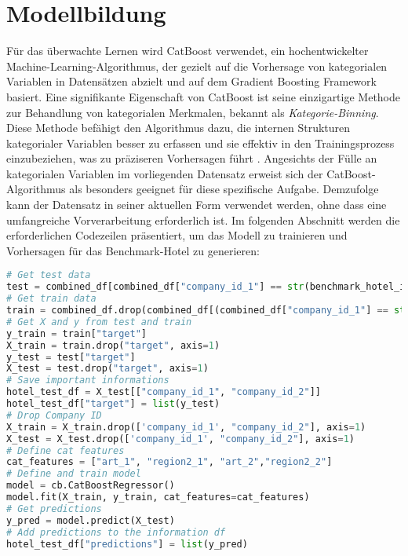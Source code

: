\section{Modellbildung}
\label{subsubsec:learn_model}
Für das überwachte Lernen wird CatBoost verwendet, ein hochentwickelter Machine-Learning-Algorithmus, der gezielt auf die Vorhersage von kategorialen Variablen in Datensätzen abzielt und auf dem Gradient Boosting Framework basiert. Eine signifikante Eigenschaft von CatBoost ist seine einzigartige Methode zur Behandlung von kategorialen Merkmalen, bekannt als \emph{Kategorie-Binning}. Diese Methode befähigt den Algorithmus dazu, die internen Strukturen kategorialer Variablen besser zu erfassen und sie effektiv in den Trainingsprozess einzubeziehen, was zu präziseren Vorhersagen führt \cite{Hancock.2020}.
\newline
\newline
Angesichts der Fülle an kategorialen Variablen im vorliegenden Datensatz erweist sich der CatBoost-Algorithmus als besonders geeignet für diese spezifische Aufgabe. Demzufolge kann der Datensatz in seiner aktuellen Form verwendet werden, ohne dass eine umfangreiche Vorverarbeitung erforderlich ist.
\newline
\newline
Im folgenden Abschnitt werden die erforderlichen Codezeilen präsentiert, um das Modell zu trainieren und Vorhersagen für das Benchmark-Hotel zu generieren:

\begin{lstlisting}[language=Python, label=lst:learn_model_train, caption=Erzeugung der Vorhersagen von ähnlichen Hotels mittels CatBoost]
# Get test data
test = combined_df[combined_df["company_id_1"] == str(benchmark_hotel_id)]
# Get train data
train = combined_df.drop(combined_df[(combined_df["company_id_1"] == str(benchmark_hotel_id)) | (combined_df["company_id_2"] == str(benchmark_hotel_id))].index)
# Get X and y from test and train
y_train = train["target"]
X_train = train.drop("target", axis=1)
y_test = test["target"]
X_test = test.drop("target", axis=1)
# Save important informations
hotel_test_df = X_test[["company_id_1", "company_id_2"]]
hotel_test_df["target"] = list(y_test)
# Drop Company ID
X_train = X_train.drop(['company_id_1', "company_id_2"], axis=1)
X_test = X_test.drop(['company_id_1', "company_id_2"], axis=1)
# Define cat features 
cat_features = ["art_1", "region2_1", "art_2","region2_2"]
# Define and train model 
model = cb.CatBoostRegressor()
model.fit(X_train, y_train, cat_features=cat_features)
# Get predictions 
y_pred = model.predict(X_test)
# Add predictions to the information df
hotel_test_df["predictions"] = list(y_pred)
\end{lstlisting}

